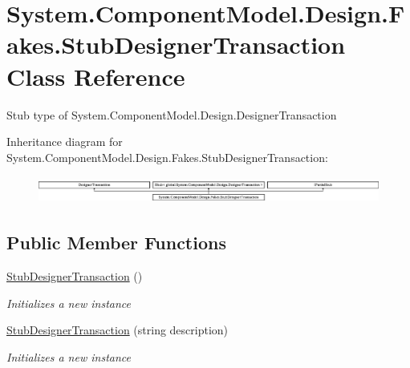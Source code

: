 \hypertarget{class_system_1_1_component_model_1_1_design_1_1_fakes_1_1_stub_designer_transaction}{\section{System.\-Component\-Model.\-Design.\-Fakes.\-Stub\-Designer\-Transaction Class Reference}
\label{class_system_1_1_component_model_1_1_design_1_1_fakes_1_1_stub_designer_transaction}
}


Stub type of System.\-Component\-Model.\-Design.\-Designer\-Transaction 


Inheritance diagram for System.\-Component\-Model.\-Design.\-Fakes.\-Stub\-Designer\-Transaction\-:\begin{figure}[H]
\begin{center}
\leavevmode
\includegraphics[height=0.897436cm]{class_system_1_1_component_model_1_1_design_1_1_fakes_1_1_stub_designer_transaction}
\end{center}
\end{figure}
\subsection*{Public Member Functions}
\begin{DoxyCompactItemize}
\item 
\hyperlink{class_system_1_1_component_model_1_1_design_1_1_fakes_1_1_stub_designer_transaction_a97f0773119da9e6a2e649d9dfd0db2d1}{Stub\-Designer\-Transaction} ()
\begin{DoxyCompactList}\small\item\em Initializes a new instance\end{DoxyCompactList}\item 
\hyperlink{class_system_1_1_component_model_1_1_design_1_1_fakes_1_1_stub_designer_transaction_a66f2be233cf8a3ece5364fd98b4d2c33}{Stub\-Designer\-Transaction} (string description)
\begin{DoxyCompactList}\small\item\em Initializes a new instance\end{DoxyCompactList}\end{DoxyCompactItemize}
